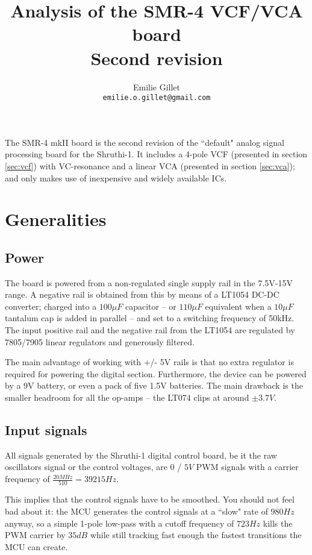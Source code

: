 \documentclass[a4paper,11pt]{article}
\title{Analysis of the SMR-4 VCF/VCA board\\Second revision}
\author{Emilie Gillet \\ \tt emilie.o.gillet@gmail.com}
\date{}
\begin{document}
\maketitle

The SMR-4 mkII board is the second revision of the ``default" analog signal processing board for the  Shruthi-1. It includes a 4-pole VCF (presented in section \ref{sec:vcf}) with VC-resonance and a linear VCA (presented in section \ref{sec:vca}); and only makes use of inexpensive and widely available ICs.

\section{Generalities}

\subsection{Power}

The board is powered from a non-regulated single supply rail in the 7.5V-15V range. A negative rail is obtained from this by means of a LT1054 DC-DC converter; charged into a $100\mu F$ capacitor -- or $110\mu F$ equivalent when a $10\mu F$ tantalum cap is added in parallel -- and set to a switching frequency of 50kHz. The input positive rail and the negative rail from the LT1054 are regulated by 7805/7905 linear regulators and generously filtered.

The main advantage of working with +/- 5V rails is that no extra regulator is required for powering the digital section. Furthermore, the device can be powered by a 9V battery, or even a pack of five 1.5V batteries. The main drawback is the smaller headroom for all the op-amps -- the LT074 clips at around $\pm 3.7V$.

\subsection{Input signals}

All signals generated by the Shruthi-1 digital control board, be it the raw oscillators signal or the control voltages, are $0$ / $5V$ PWM signals with a carrier frequency of $\frac{20MHz}{510} = 39215 Hz$.

This implies that the control signals have to be smoothed. You should not feel bad about it: the MCU generates the control signals at a ``slow" rate of $980 Hz$ anyway, so a simple 1-pole low-pass with a cutoff frequency of $723 Hz$ kills the PWM carrier by $35dB$ while still tracking fast enough the fastest transitions the MCU can create.
\end{document}
